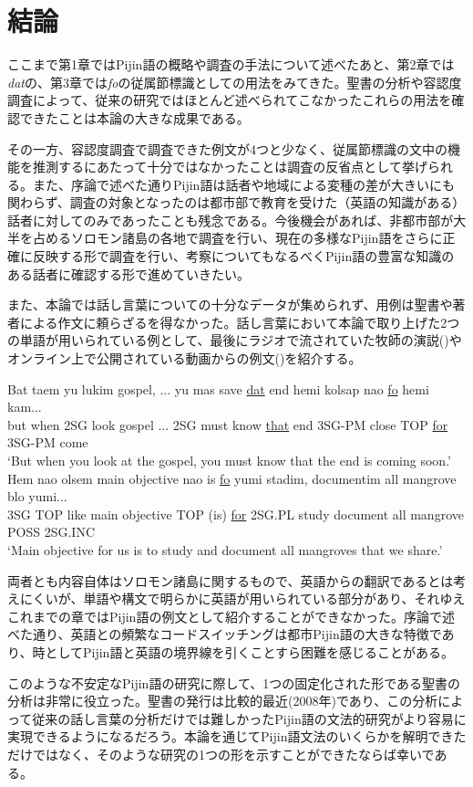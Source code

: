 \chapter{結論}\label{sec:conclusion}
ここまで第1章ではPijin語の概略や調査の手法について述べたあと、第2章では\textit{dat}の、第3章では\textit{fo}の従属節標識としての用法をみてきた。聖書の分析や容認度調査によって、従来の研究ではほとんど述べられてこなかったこれらの用法を確認できたことは本論の大きな成果である。

その一方、容認度調査で調査できた例文が4つと少なく、従属節標識の文中の機能を推測するにあたって十分ではなかったことは調査の反省点として挙げられる。また、序論で述べた通りPijin語は話者や地域による変種の差が大きいにも関わらず、調査の対象となったのは都市部で教育を受けた（英語の知識がある）話者に対してのみであったことも残念である。今後機会があれば、非都市部が大半を占めるソロモン諸島の各地で調査を行い、現在の多様なPijin語をさらに正確に反映する形で調査を行い、考察についてもなるべくPijin語の豊富な知識のある話者に確認する形で進めていきたい。

また、本論では話し言葉についての十分なデータが集められず、用例は聖書や著者による作文に頼らざるを得なかった。話し言葉において本論で取り上げた2つの単語が用いられている例として、最後にラジオで流されていた牧師の演説()やオンライン上で公開されている動画からの例文()を紹介する。

\begin{exe}
\ex\label{bokushi}
\gll Bat taem yu lukim gospel, ... yu mas save \underline{dat} end hemi kolsap nao \underline{fo} hemi kam...\\
but when 2SG look gospel ... 2SG must know \underline{that} end 3SG-PM close TOP \underline{for} 3SG-PM come\\
\glt `But when you look at the gospel, you must know that the end is coming soon.'
\ex\label{manguru1}
\gll Hem nao olsem main objective nao is \underline{fo} yumi stadim, documentim all mangrove blo yumi...\\
3SG TOP like main objective TOP (is) \underline{for} 2SG.PL study document all mangrove POSS 2SG.INC\\
\glt `Main objective for us is to study and document all mangroves that we share.'\citep[20分4秒]{manguru}
\end{exe}

両者とも内容自体はソロモン諸島に関するもので、英語からの翻訳であるとは考えにくいが、単語や構文で明らかに英語が用いられている部分があり、それゆえこれまでの章ではPijin語の例文として紹介することができなかった。序論で述べた通り、英語との頻繁なコードスイッチングは都市Pijin語の大きな特徴であり、時としてPijin語と英語の境界線を引くことすら困難を感じることがある。

このような不安定なPijin語の研究に際して、1つの固定化された形である聖書の分析は非常に役立った。聖書の発行は比較的最近(2008年)であり、この分析によって従来の話し言葉の分析だけでは難しかったPijin語の文法的研究がより容易に実現できるようになるだろう。本論を通じてPijin語文法のいくらかを解明できただけではなく、そのような研究の1つの形を示すことができたならば幸いである。
